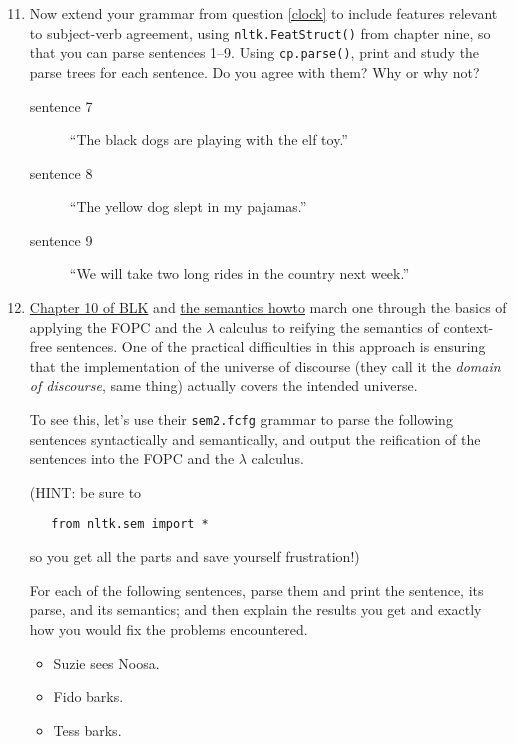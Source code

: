 \documentclass[11pt]{article}
\begin{document}
\begin{enumerate}
\setcounter{enumi}{10}
\item \label{basic-fea-struc} Now extend your grammar from question \ref{clock} to include features
relevant to subject-verb agreement, using \texttt{nltk.FeatStruct()} from
chapter nine, so that you can parse sentences 1--9.  Using
\texttt{cp.parse()}, print and study the parse trees for each sentence.  Do
you agree with them?  Why or why not?

\begin{description}
\item[{sentence 7}] ``The black dogs are playing with the elf toy.''
\item[{sentence 8}] ``The yellow dog slept in my pajamas.''
\item[{sentence 9}] ``We will take two long rides in the country next week.''
\end{description}

\setcounter{enumi}{11}
\item \label{fopc} \href{../../reading/blk\_2nd\_ed.pdf}{Chapter 10 of BLK} and \href{http://www.nltk.org/howto/semantics.html}{the semantics howto} march one through the basics
of applying the FOPC and the \(\lambda\) calculus to reifying the semantics of
context-free sentences.  One of the practical difficulties in this
approach is ensuring that the implementation of the universe of
discourse (they call it the \emph{domain of discourse}, same thing) actually
covers the intended universe.

To see this, let's use their \texttt{sem2.fcfg} grammar to parse the following
sentences syntactically and semantically, and output the reification of
the sentences into the FOPC and the \(\lambda\) calculus.  

(HINT: be sure to 
\begin{verbatim}
   from nltk.sem import *
\end{verbatim}
so you get all the parts and save yourself frustration!)  

For each of the following sentences, parse them and print the sentence,
its parse, and its semantics; and then explain the results you get and
exactly how you would fix the problems encountered.

\begin{itemize}
\item Suzie sees Noosa.
\item Fido barks.
\item Tess barks.
\end{itemize}
\end{enumerate}
\end{document}
